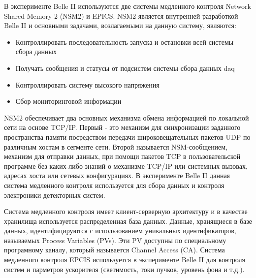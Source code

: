   В эксперименте Belle II используются две системы медленного контроля Network Shared Memory 2 (NSM2) и EPICS. NSM2 является внутренней разработкой Belle II и основными задачами, возлагаемыми на данную систему, являются:
\begin{itemize}
  \item Контроллировать последовательность запуска и остановки всей системы сбора данных
  \item Получать сообщения и статусы от подсистем системы сбора данных daq
  \item Контроллировать систему высокого напряжения
  \item Сбор мониторинговой информации
\end{itemize}
NSM2 обеспечивает два основных механизма обмена информацией по локальной сети на основе TCP/IP. Первый - это механизм для синхронизации заданного пространства памяти посредством передачи широковещательных пакетов UDP по различным хостам в сегменте сети. Второй называется NSM-сообщением, механизм для отправки данных, при помощи пакетов TCP в пользовательской программе без каких-либо знаний о механизме TCP/IP или системных вызовах, адресах хоста или сетевых конфигурациях. В эксперименте Belle II данная система медленного контроля используется для сбора данных и контроля электроники детекторных систем.\par
  Система медленного контроля имеет клиент-серверную архитектуру и в качестве хранилища используется распределенная база данных. Данные, хранящиеся в базе данных, идентифицируются с использованием уникальных идентификаторов, называемых Process Variables (PVs). Эти PV доступны по специальному програмному каналу, который называется Channel Access (CA). Система медленного контроля EPCIS используется в эксперименте Belle II для контроля систем и парметров ускорителя (светимость, токи пучков, уровень фона и т.д.).
